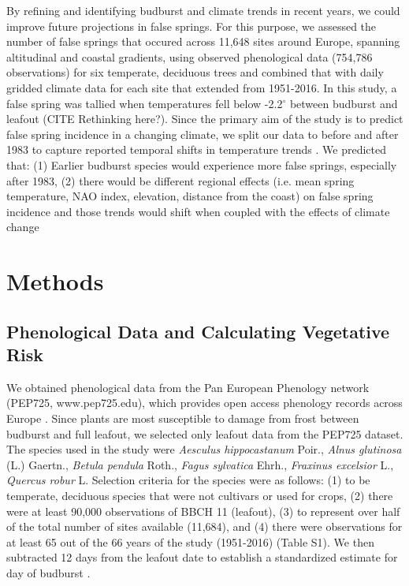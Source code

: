 \documentclass{article}\usepackage[]{graphicx}\usepackage[]{color}
\begin{document}
By refining and identifying budburst and climate trends in recent years, we could improve future projections in false springs. For this purpose, we assessed the number of false springs that occured across 11,648 sites around Europe, spanning altitudinal and coastal gradients, using observed phenological data (754,786 observations) for six temperate, deciduous trees and combined that with daily gridded climate data for each site that extended from 1951-2016. In this study, a false spring was tallied when temperatures fell below -2.2$^{\circ}$ \citep{Schwartz1993} between budburst and leafout (CITE Rethinking here?). Since the primary aim of the study is to predict false spring incidence in a changing climate, we split our data to before and after 1983 to capture reported temporal shifts in temperature trends \citep{Stocker2013, Kharouba2018}. We predicted that: (1) Earlier budburst species would experience more false springs, especially after 1983, (2) there would be different regional effects (i.e. mean spring temperature, NAO index, elevation, distance from the coast) on false spring incidence and those trends would shift when coupled with the effects of climate change 


\section*{Methods}
\subsection*{Phenological Data and Calculating Vegetative Risk}
We obtained phenological data from the Pan European Phenology network (PEP725, www.pep725.edu), which provides open access phenology records across Europe \citep{Templ2018}. Since plants are most susceptible to damage from frost between budburst and full leafout, we selected only leafout data \citep[i.e., in][BBCH 11, which is defined as the point of leaf unfolding and the first visible leaf stalk]{Meier2001} from the PEP725 dataset. The species used in the study were \textit{Aesculus hippocastanum} Poir., \textit{Alnus glutinosa} (L.) Gaertn., \textit{Betula pendula} Roth., \textit{Fagus sylvatica} Ehrh., \textit{Fraxinus excelsior} L., \textit{Quercus robur} L. Selection criteria for the species were as follows: (1) to be temperate, deciduous species that were not cultivars or used for crops, (2) there were at least 90,000 observations of BBCH 11 (leafout), (3) to represent over half of the total number of sites available (11,684), and (4) there were observations for at least 65 out of the 66 years of the study (1951-2016) (Table S1). We then subtracted 12 days from the leafout date to establish a standardized estimate for day of budburst \citep{Donnelly2017}.
\end{document}
